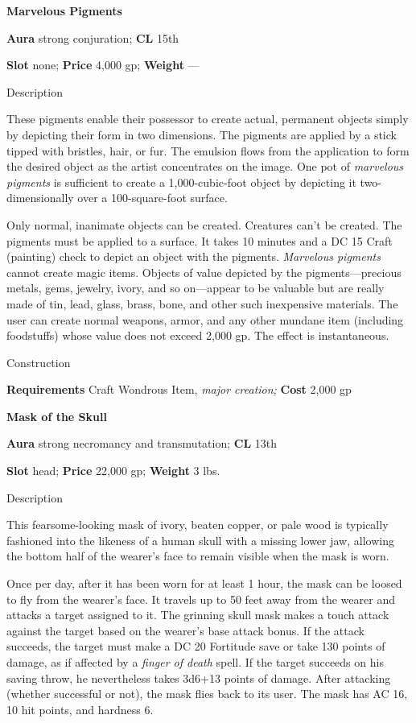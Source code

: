 \textbf{Marvelous Pigments}
				
\textbf{Aura} strong conjuration;\textbf{ CL }15th
				
\textbf{Slot} none; \textbf{Price} 4,000 gp; \textbf{Weight }---
				
Description
				
These pigments enable their possessor to create actual, permanent objects simply by depicting their form in two dimensions. The pigments are applied by a stick tipped with bristles, hair, or fur. The emulsion flows from the application to form the desired object as the artist concentrates on the image. One pot of \textit{marvelous pigments} is sufficient to create a 1,000-cubic-foot object by depicting it two-dimensionally over a 100-square-foot surface. 
				
Only normal, inanimate objects can be created. Creatures can't be created. The pigments must be applied to a surface. It takes 10 minutes and a DC 15 Craft (painting) check to depict an object with the pigments. \textit{Marvelous pigments} cannot create magic items. Objects of value depicted by the pigments---precious metals, gems, jewelry, ivory, and so on---appear to be valuable but are really made of tin, lead, glass, brass, bone, and other such inexpensive materials. The user can create normal weapons, armor, and any other mundane item (including foodstuffs) whose value does not exceed 2,000 gp. The effect is instantaneous. 
				
Construction
				
\textbf{Requirements} Craft Wondrous Item,\textit{ major creation;}\textbf{ Cost }2,000 gp
				
\textbf{Mask of the Skull}
				
\textbf{Aura} strong necromancy and transmutation;\textbf{ CL }13th
				
\textbf{Slot} head; \textbf{Price} 22,000 gp; \textbf{Weight} 3 lbs.
				
Description
				
This fearsome-looking mask of ivory, beaten copper, or pale wood is typically fashioned into the likeness of a human skull with a missing lower jaw, allowing the bottom half of the wearer's face to remain visible when the mask is worn.
				
Once per day, after it has been worn for at least 1 hour, the mask can be loosed to fly from the wearer's face. It travels up to 50 feet away from the wearer and attacks a target assigned to it. The grinning skull mask makes a touch attack against the target based on the wearer's base attack bonus. If the attack succeeds, the target must make a DC 20 Fortitude save or take 130 points of damage, as if affected by a \textit{finger of death} spell. If the target succeeds on his saving throw, he nevertheless takes 3d6+13 points of damage. After attacking (whether successful or not), the mask flies back to its user. The mask has AC 16, 10 hit points, and hardness 6. 
				

